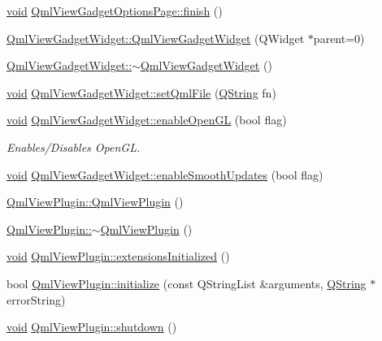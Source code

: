 \begin{DoxyCompactItemize}
\item 
\hyperlink{group___u_a_v_objects_plugin_ga444cf2ff3f0ecbe028adce838d373f5c}{void} \hyperlink{group___o_p_map_plugin_ga8730978634b18a85389188571ad7fec5}{\-Qml\-View\-Gadget\-Options\-Page\-::finish} ()
\item 
\hyperlink{group___o_p_map_plugin_ga5f276e99396b6fdc55b2809358cdc036}{\-Qml\-View\-Gadget\-Widget\-::\-Qml\-View\-Gadget\-Widget} (\-Q\-Widget $\ast$parent=0)
\item 
\hyperlink{group___o_p_map_plugin_gab474fe9554896c3815e74bd3979a54a9}{\-Qml\-View\-Gadget\-Widget\-::$\sim$\-Qml\-View\-Gadget\-Widget} ()
\item 
\hyperlink{group___u_a_v_objects_plugin_ga444cf2ff3f0ecbe028adce838d373f5c}{void} \hyperlink{group___o_p_map_plugin_gadd4680d8e3dc82c1a2fc6812c609535d}{\-Qml\-View\-Gadget\-Widget\-::set\-Qml\-File} (\hyperlink{group___u_a_v_objects_plugin_gab9d252f49c333c94a72f97ce3105a32d}{\-Q\-String} fn)
\item 
\hyperlink{group___u_a_v_objects_plugin_ga444cf2ff3f0ecbe028adce838d373f5c}{void} \hyperlink{group___o_p_map_plugin_gae8d1d0bb3f42b7107492b4e146544e5d}{\-Qml\-View\-Gadget\-Widget\-::enable\-Open\-G\-L} (bool flag)
\begin{DoxyCompactList}\small\item\em \-Enables/\-Disables \-Open\-G\-L. \end{DoxyCompactList}\item 
\hyperlink{group___u_a_v_objects_plugin_ga444cf2ff3f0ecbe028adce838d373f5c}{void} \hyperlink{group___o_p_map_plugin_ga6c243c31f5bf4653f0bbd7b10527beb3}{\-Qml\-View\-Gadget\-Widget\-::enable\-Smooth\-Updates} (bool flag)
\item 
\hyperlink{group___o_p_map_plugin_ga1276ad345027c9b33c40edc2e447dd98}{\-Qml\-View\-Plugin\-::\-Qml\-View\-Plugin} ()
\item 
\hyperlink{group___o_p_map_plugin_gab669bd345bdb7a755f4f767edf44f5fc}{\-Qml\-View\-Plugin\-::$\sim$\-Qml\-View\-Plugin} ()
\item 
\hyperlink{group___u_a_v_objects_plugin_ga444cf2ff3f0ecbe028adce838d373f5c}{void} \hyperlink{group___o_p_map_plugin_ga36fa5cb525a31c9b6877a3da80262f69}{\-Qml\-View\-Plugin\-::extensions\-Initialized} ()
\item 
bool \hyperlink{group___o_p_map_plugin_ga07810591116e8f592fca15a0fe4e3b1d}{\-Qml\-View\-Plugin\-::initialize} (const \-Q\-String\-List \&arguments, \hyperlink{group___u_a_v_objects_plugin_gab9d252f49c333c94a72f97ce3105a32d}{\-Q\-String} $\ast$error\-String)
\item 
\hyperlink{group___u_a_v_objects_plugin_ga444cf2ff3f0ecbe028adce838d373f5c}{void} \hyperlink{group___o_p_map_plugin_ga181dc94c5cc23521ffde448715c6ad8e}{\-Qml\-View\-Plugin\-::shutdown} ()
\end{DoxyCompactItemize}
